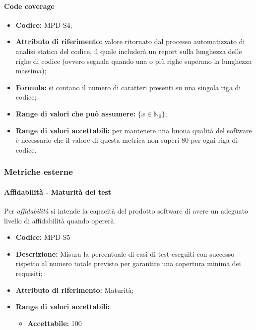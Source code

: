 \paragraph{Code coverage}
\begin{itemize}
    \item \textbf{Codice:} MPD-S4;
    \item \textbf{Attributo di riferimento:} valore ritornato dal processo automatizzato di analisi statica del codice, il quale includerà un report sulla lunghezza delle righe di codice
                                            (ovvero segnala quando una o più righe superano la lunghezza massima);
    \item \textbf{Formula:} si contano il numero di caratteri presenti su una singola riga di codice;
    \item \textbf{Range di valori che può assumere:} $\{x \in \mathbb{N}_0 \}$;
    \item \textbf{Range di valori accettabili:} per mantenere una buona qualità del software è necessario che il valore di questa metrica non superi
    80 per ogni riga di codice.
\end{itemize}


\subsubsection{Metriche esterne}

\paragraph{Affidabilità - Maturità dei test}
Per \textit{affidabilità} si intende la capacità del prodotto software di avere un adeguato livello di affidabilità quando opererà.

\begin{itemize}
    \item \textbf{Codice:}  MPD-S5
    \item \textbf{Descrizione:} Misura la percentuale di casi di test eseguiti con successo rispetto al numero totale previsto per garantire una copertura minima dei requisiti;
    \item \textbf{Attributo di riferimento:} Maturità;
    \item \textbf{Range di valori accettabili:}
    \begin{itemize}
        \item \textbf{Accettabile:} 100%
       
    \end{itemize}
\end{itemize}


